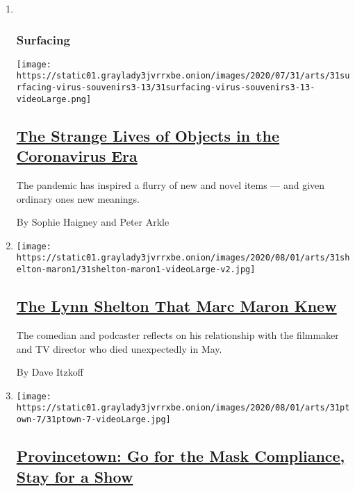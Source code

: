 \begin{enumerate}
\def\labelenumi{\arabic{enumi}.}
\item ~
  \hypertarget{surfacing}{%
  \subsubsection{Surfacing}\label{surfacing}}

  \texttt{[image: https://static01.graylady3jvrrxbe.onion/images/2020/07/31/arts/31surfacing-virus-souvenirs3-13/31surfacing-virus-souvenirs3-13-videoLarge.png]}

  \hypertarget{the-strange-lives-of-objects-in-the-coronavirus-era}{%
  \subsection{\texorpdfstring{\href{/2020/08/01/arts/design/virus-design-objects.html}{The
  Strange Lives of Objects in the Coronavirus
  Era}}{The Strange Lives of Objects in the Coronavirus Era}}\label{the-strange-lives-of-objects-in-the-coronavirus-era}}

  The pandemic has inspired a flurry of new and novel items --- and
  given ordinary ones new meanings.

  By Sophie Haigney and Peter Arkle
\item
  \texttt{[image: https://static01.graylady3jvrrxbe.onion/images/2020/08/01/arts/31shelton-maron1/31shelton-maron1-videoLarge-v2.jpg]}

  \hypertarget{the-lynn-shelton-that-marc-maron-knew}{%
  \subsection{\texorpdfstring{\href{/2020/07/31/movies/marc-maron-lynn-shelton.html}{The
  Lynn Shelton That Marc Maron
  Knew}}{The Lynn Shelton That Marc Maron Knew}}\label{the-lynn-shelton-that-marc-maron-knew}}

  The comedian and podcaster reflects on his relationship with the
  filmmaker and TV director who died unexpectedly in May.

  By Dave Itzkoff
\item
  \texttt{[image: https://static01.graylady3jvrrxbe.onion/images/2020/08/01/arts/31ptown-7/31ptown-7-videoLarge.jpg]}

  \hypertarget{provincetown-go-for-the-mask-compliance-stay-for-a-show}{%
  \subsection{\texorpdfstring{\href{/2020/07/31/theater/provincetown-nightlife-coronavirus.html}{Provincetown:
  Go for the Mask Compliance, Stay for a
  Show}}{Provincetown: Go for the Mask Compliance, Stay for a Show}}\label{provincetown-go-for-the-mask-compliance-stay-for-a-show}}


\end{enumerate}
